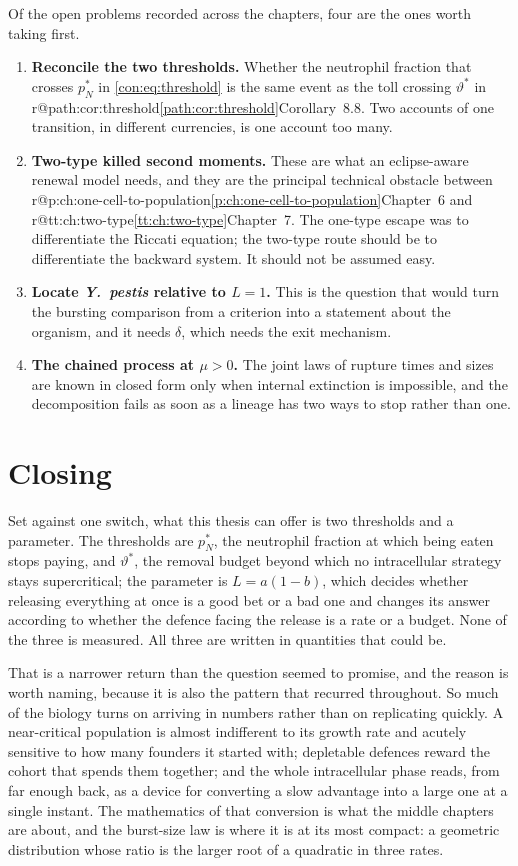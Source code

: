 \documentclass[11pt,a4paper]{report}
\makeatletter
\newcommand{\yp}{\textit{Y.~pestis}}
\providecommand{\mextref}[2]{%
  \ifcsname r@#1\endcsname\cref{#1}\else#2\fi}
\theoremstyle{plain}
\theoremstyle{remark}
\makeatother
\begin{document}
Of the open problems recorded across the chapters, four are the ones worth
taking first.

\begin{enumerate}[leftmargin=1.8em,itemsep=0.3em]
\item \textbf{Reconcile the two thresholds.} Whether the neutrophil fraction
that crosses $p_N^{\ast}$ in \cref{con:eq:threshold} is the same event as the
toll crossing $\vartheta^{\ast}$ in
\mextref{path:cor:threshold}{Corollary~8.8}. Two accounts of one transition,
in different currencies, is one account too many.
\item \textbf{Two-type killed second moments.} These are what an
eclipse-aware renewal model needs, and they are the principal technical
obstacle between \mextref{p:ch:one-cell-to-population}{Chapter~6} and
\mextref{tt:ch:two-type}{Chapter~7}. The one-type escape was to
differentiate the Riccati equation; the two-type route should be to
differentiate the backward system. It should not be assumed easy.
\item \textbf{Locate \yp{} relative to $L=1$.} This is the question that
would turn the bursting comparison from a criterion into a statement about
the organism, and it needs $\delta$, which needs the exit mechanism.
\item \textbf{The chained process at $\mu>0$.} The joint laws of rupture
times and sizes are known in closed form only when internal extinction is
impossible, and the decomposition fails as soon as a lineage has two ways to
stop rather than one.
\end{enumerate}

\section{Closing}
\label{con:sec:closing}

Set against one switch, what this thesis can offer is two thresholds and a
parameter. The thresholds are $p_N^{\ast}$, the neutrophil fraction at which
being eaten stops paying, and $\vartheta^{\ast}$, the removal budget beyond
which no intracellular strategy stays supercritical; the parameter is
$L=a(1-b)$, which decides whether releasing everything at once is a good bet
or a bad one and changes its answer according to whether the defence facing
the release is a rate or a budget. None of the three is measured. All three
are written in quantities that could be.

That is a narrower return than the question seemed to promise, and the reason
is worth naming, because it is also the pattern that recurred throughout. So
much of the biology turns on arriving in numbers rather than on replicating
quickly. A near-critical population is almost indifferent to its growth rate
and acutely sensitive to how many founders it started with; depletable
defences reward the cohort that spends them together; and the whole
intracellular phase reads, from far enough back, as a device for converting a
slow advantage into a large one at a single instant. The mathematics of that
conversion is what the middle chapters are about, and the burst-size law is
where it is at its most compact: a geometric distribution whose ratio is the
larger root of a quadratic in three rates.
\end{document}
